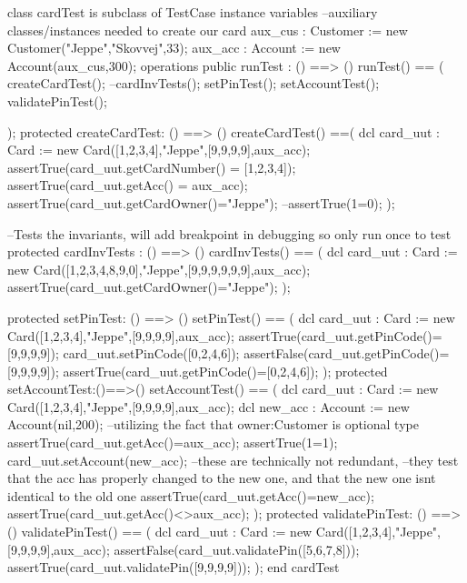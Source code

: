 \documentclass[a4paper]{article}
\begin{document}
\title{}
\author{}
\begin{vdm_al}

class cardTest is subclass of TestCase
instance variables
    --auxiliary classes/instances needed to create our card
    aux_cus : Customer := new Customer("Jeppe","Skovvej",33);
    aux_acc : Account := new Account(aux_cus,300);
operations
    public runTest : () ==> ()
    runTest() == (
        createCardTest();
        --cardInvTests();
        setPinTest();
        setAccountTest();
        validatePinTest();

    );
    protected createCardTest: () ==> ()
    createCardTest() ==(
        dcl card_uut : Card := new Card([1,2,3,4],"Jeppe",[9,9,9,9],aux_acc);
        assertTrue(card_uut.getCardNumber() = [1,2,3,4]);
        assertTrue(card_uut.getAcc() = aux_acc);
        assertTrue(card_uut.getCardOwner()="Jeppe");
        --assertTrue(1=0);
    );
    
    --Tests the invariants, will add breakpoint in debugging so only run once to test
    protected cardInvTests : () ==> ()
    cardInvTests() == (
        dcl card_uut : Card := new Card([1,2,3,4,8,9,0],"Jeppe",[9,9,9,9,9,9],aux_acc);
        assertTrue(card_uut.getCardOwner()="Jeppe");
    ); 

    protected setPinTest: () ==> ()
    setPinTest() == (
        dcl card_uut : Card := new Card([1,2,3,4],"Jeppe",[9,9,9,9],aux_acc);
        assertTrue(card_uut.getPinCode()=[9,9,9,9]);
        card_uut.setPinCode([0,2,4,6]);
        assertFalse(card_uut.getPinCode()=[9,9,9,9]);
        assertTrue(card_uut.getPinCode()=[0,2,4,6]);
    );
    protected setAccountTest:()==>()
    setAccountTest() == (
        dcl card_uut : Card := new Card([1,2,3,4],"Jeppe",[9,9,9,9],aux_acc);
        dcl new_acc : Account := new Account(nil,200); --utilizing the fact that owner:Customer is optional type
        assertTrue(card_uut.getAcc()=aux_acc);
        assertTrue(1=1);
        card_uut.setAccount(new_acc);
        --these are technically not redundant, 
        --they test that the acc has properly changed to the new one, and that the new one isnt identical to the old one
        assertTrue(card_uut.getAcc()=new_acc);
        assertTrue(card_uut.getAcc()<>aux_acc);
    );
    protected validatePinTest: () ==> ()
    validatePinTest() == (
        dcl card_uut : Card := new Card([1,2,3,4],"Jeppe",[9,9,9,9],aux_acc);
        assertFalse(card_uut.validatePin([5,6,7,8]));
        assertTrue(card_uut.validatePin([9,9,9,9]));
    );
end cardTest
\end{vdm_al}
\end{document}
